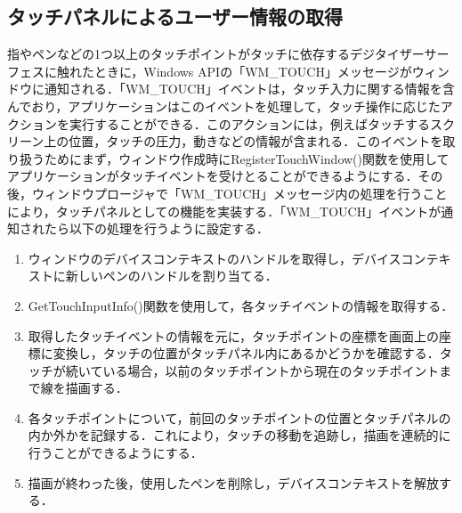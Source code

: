\subsection{タッチパネルによるユーザー情報の取得}
指やペンなどの1つ以上のタッチポイントがタッチに依存するデジタイザーサーフェスに触れたときに，Windows APIの「WM\_TOUCH」メッセージがウィンドウに通知される．「WM\_TOUCH」イベントは，タッチ入力に関する情報を含んでおり，アプリケーションはこのイベントを処理して，タッチ操作に応じたアクションを実行することができる．このアクションには，例えばタッチするスクリーン上の位置，タッチの圧力，動きなどの情報が含まれる．このイベントを取り扱うためにまず，ウィンドウ作成時にRegisterTouchWindow()関数を使用してアプリケーションがタッチイベントを受けとることができるようにする．その後，ウィンドウプロージャで「WM\_TOUCH」メッセージ内の処理を行うことにより，タッチパネルとしての機能を実装する．「WM\_TOUCH」イベントが通知されたら以下の処理を行うように設定する．
\begin{enumerate}[leftmargin=*]
  \item ウィンドウのデバイスコンテキストのハンドルを取得し，デバイスコンテキストに新しいペンのハンドルを割り当てる．
  \item GetTouchInputInfo()関数を使用して，各タッチイベントの情報を取得する．
  \item 取得したタッチイベントの情報を元に，タッチポイントの座標を画面上の座標に変換し，タッチの位置がタッチパネル内にあるかどうかを確認する．タッチが続いている場合，以前のタッチポイントから現在のタッチポイントまで線を描画する．
  \item 各タッチポイントについて，前回のタッチポイントの位置とタッチパネルの内か外かを記録する．これにより，タッチの移動を追跡し，描画を連続的に行うことができるようにする．
  \item 描画が終わった後，使用したペンを削除し，デバイスコンテキストを解放する．
\end{enumerate}

